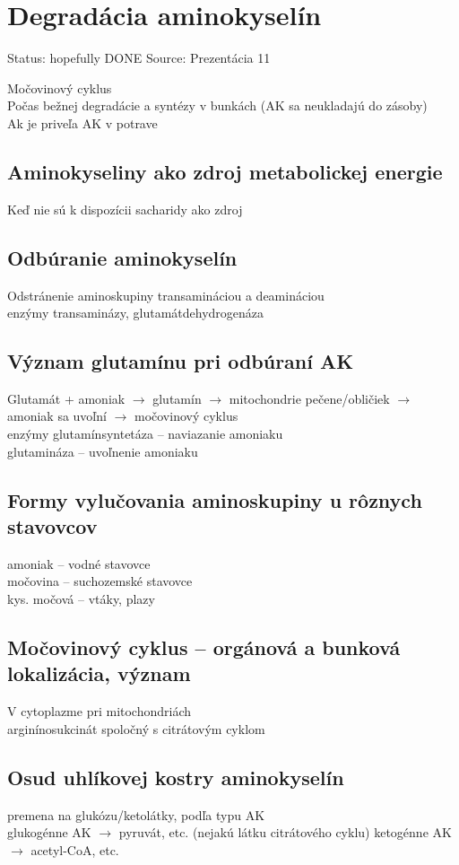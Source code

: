 \section{Degradácia aminokyselín}

Status: hopefully DONE
Source: Prezentácia 11

Močovinový cyklus\\
Počas bežnej degradácie a syntézy v bunkách (AK sa neukladajú do zásoby)\\
Ak je priveľa AK v potrave\\
\subsection*{Aminokyseliny ako zdroj metabolickej energie}
Keď nie sú k dispozícii sacharidy ako zdroj\\
\subsection*{Odbúranie aminokyselín}
Odstránenie aminoskupiny transamináciou a deamináciou\\
enzýmy transaminázy, glutamátdehydrogenáza\\
\subsection*{Význam glutamínu pri odbúraní AK}
Glutamát + amoniak $\rightarrow$ glutamín $\rightarrow$ mitochondrie pečene/obličiek $\rightarrow$ amoniak sa uvoľní $\rightarrow$ močovinový cyklus\\
enzýmy glutamínsyntetáza -- naviazanie amoniaku\\
glutamináza -- uvoľnenie amoniaku\\
\subsection*{Formy vylučovania aminoskupiny u rôznych stavovcov}
amoniak -- vodné stavovce\\
močovina -- suchozemské stavovce\\
kys. močová -- vtáky, plazy\\
\subsection*{Močovinový cyklus -- orgánová a bunková lokalizácia, význam}
V cytoplazme pri mitochondriách\\
arginínosukcinát spoločný s citrátovým cyklom\\
\subsection*{Osud uhlíkovej kostry aminokyselín}
premena na glukózu/ketolátky, podľa typu AK\\
glukogénne AK $\rightarrow$ pyruvát, etc. (nejakú látku citrátového cyklu)
ketogénne AK $\rightarrow$ acetyl-CoA, etc.
